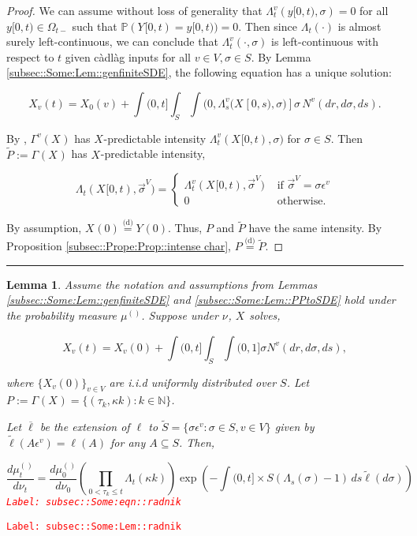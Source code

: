 \documentclass[12pt]{article}
\newcommand{\mb}{\mathbb}
\newcommand{\ov}{\overline}
\newcommand{\te}{\text}
\newcommand{\ep}{\epsilon}
\newcommand{\tr}{\textcolor{red}}
\newcommand{\labe}[1]{\tr{\texttt{Label: #1}}}
\newcommand{\ind}{\hspace{24pt}}
\newcommand{\lin}{\rule{\linewidth}{0.4 pt}}
\newcommand{\pr}{\mb{P}}							%
\newcommand{\deq}{\overset{\text{(d)}}{=}}			%
\newcommand{\defeq}{:=}								%
\renewcommand{\v}{v}							%
\renewcommand{\S}{S}							%
\newcommand{\s}{\sigma}							%
\newcommand{\sv}{\vec{\s}}						%
\newcommand{\ev}{\ep}							%
\renewcommand{\t}{t}							%
\newcommand{\sset}{\Omega}						%
\renewcommand{\tt}{s}							%
\newcommand{\X}{X}								%
\newcommand{\vind}[1]{^{#1}}					%
\newcommand{\vsi}[1]{^{#1}}						%
\newcommand{\cind}[1]{_{#1}}					%
\newcommand{\tp}[1]{(#1)}						%
\newcommand{\tip}[1]{#1}						%
\newcommand{\ts}[1]{_{#1}}						%
\newcommand{\sln}[1]{^{(#1)}}					%
\newcommand{\poiss}{N}							%
\newcommand{\Sm}{\ell}							%
\renewcommand{\r}{r}							%
\newcommand{\alt}[1]{\widetilde{#1}}			%
\newcommand{\indx}[1]{_{#1}}					%
\newcommand{\m}{\mu}							%
\newcommand{\mm}{\nu}							%
\newcommand{\XX}{Y}								%
\newcommand{\rt}{\tau}							%
\renewcommand{\it}{k}							%
\newcommand{\pmap}{\Gamma}						%
\renewcommand{\mark}{\kappa}					%
\newcommand{\rp}{P}								%
\newcommand{\typset}{A}							%
\newcommand{\ratee}{\Lambda}					%
\newcommand{\xx}{y}								%
\newtheorem{lem}[thms]{Lemma}
\begin{document}
\begin{proof}

We can assume without loss of generality that \(\ratee\ts{\t}\vind{\v}(\xx{}{[0,\t)},\s) = 0\) for all \(\xx{}{[0,\t)}\in \sset\vsi{}\ts{\t-}\) such that \(\pr(\XX\cind{}\tip{[0,\t)} = \xx{}{[0,\t)}) = 0\). Then since \(\ratee\ts{\t}(\cdot)\) is almost surely left-continuous, we can conclude that \(\ratee\ts{\t}\vind{\v}(\cdot,\s)\) is left-continuous with respect to \(\t\) given c\`adl\`ag inputs for all \(\v\in V,\s\in\S\). By Lemma \ref{subsec::Some:Lem::genfiniteSDE}, the following equation has a unique solution:

\[\X\cind{\v}\tp{\t} = \X\cind{0}\tp{\v} + \int{(0,\t]}\int_\S\int{(0,\ratee\ts{\tt}\vind{\v}(\X\cind{}\tip{[0,\tt)},\s)]}  \s\,\poiss\vind{\v}(d\r,d\s,d\tt).\]

By \cite[Exercise 14.7.1]{DalVer08}, \(\pmap\vind{\v}(\X\cind{}\tip{})\) has \(\X\cind{}\tip{}\)-predictable intensity \(\ratee\ts{\t}\vind{\v}(\X\cind{}\tip{[0,\t)},\s)\) for \(\s \in \S\). Then \(\alt{\rp} \defeq \pmap\vind{}(\X\cind{}\tip{})\) has \(\X\cind{}\tip{}\)-predictable intensity,

\[\ratee\ts{\t}(\X\cind{}\tip{[0,\t)},\sv\cind{}\vsi{V}) = \begin{cases}
\ratee\ts{\t}\vind{\v}(\X\cind{}\tip{[0,\t)},\sv\cind{}\vsi{V}) &\te{ if } \sv\cind{}\vsi{V} = \s\ev\vind{\v}\\
0&\te{ otherwise.}
\end{cases}\]

By assumption, \(\X\cind{}\tp{0} \deq \XX\cind{}\tp{0}\). Thus, \(\rp\) and \(\alt{\rp}\) have the same intensity. By Proposition \ref{subsec::Prope:Prop::intense char}, \(\rp \deq \alt{\rp}\).
\end{proof}
\lin

\begin{lem}
Assume the notation and assumptions from Lemmas \ref{subsec::Some:Lem::genfiniteSDE} and \ref{subsec::Some:Lem::PPtoSDE} hold under the probability measure \(\m\sln{}\ts{}\). Suppose under \(\mm\vind{}\ts{}\), \(\X\cind{}\tip{}\) solves,

\[\X\cind{\v}\tp{\t} = \X\cind{\v}\tp{0} +\int{(0,\t]}\int_\S\int{(0,1]} \s \poiss\vind{\v}(d\r,d\s,d\tt),\]

where \(\{\X\cind{\v}\tp{0}\}_{\v \in V}\) are i.i.d uniformly distributed over \(\S\). Let \(\rp \defeq \pmap\vind{}(\X\cind{}\tip{}) = \{(\rt\indx{\it},\mark{\it}):\it\in \mb{N}\}\).

\ind Let \(\ov{\ell}\) be the extension of \(\Sm\) to \(\alt{\S} = \{\s\ev\vind{\v}: \s \in \S, \v \in V\}\) given by \(\alt{\Sm}(\typset\ev\vind{\v}) = \Sm(\typset)\) for any \(\typset \subseteq \S\). Then,

\begin{equation}
\frac{d\m\sln{}\ts{\t}}{d\mm\vind{}\ts{\t}}= \frac{d\m\sln{}\ts{0}}{d\mm\vind{}\ts{0}}\left(\prod_{0< \rt\indx{\it}\leq \t} \ratee\ts{\t}(\mark{\it})\right)\exp\left(-\int{(0,\t]\times \S} (\ratee\ts{\tt}(\s) - 1)\,d\tt\alt{\Sm}(d\s)\right)
\label{subsec::Some:eqn::radnik}
\end{equation}
\labe{subsec::Some:eqn::radnik}
\label{subsec::Some:Lem::radnik}
\end{lem}
\labe{subsec::Some:Lem::radnik}
\end{document}
